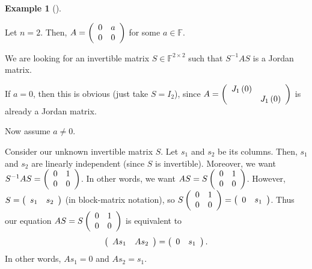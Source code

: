 \documentclass[numbers=enddot,12pt,final,onecolumn,notitlepage]{scrartcl}%
\numberwithin{exer}{subsection}
\theoremstyle{definition}
\newtheorem{exam}[theo]{Example}
\newenvironment{example}[1][]
{\begin{exam}[#1]\begin{leftbar}}
{\end{leftbar}\end{exam}}
\begin{document}
\begin{example}
Let $n=2$. Then, $A=\left(
\begin{array}
[c]{cc}%
0 & a\\
0 & 0
\end{array}
\right)  $ for some $a\in\mathbb{F}$.

We are looking for an invertible matrix $S\in\mathbb{F}^{2\times2}$ such that
$S^{-1}AS$ is a Jordan matrix.

If $a=0$, then this is obvious (just take $S=I_{2}$), since $A=\left(
\begin{array}
[c]{cc}%
J_{1}\left(  0\right)  & \\
& J_{1}\left(  0\right)
\end{array}
\right)  $ is already a Jordan matrix.

Now assume $a\neq0$.

Consider our unknown invertible matrix $S$. Let $s_{1}$ and $s_{2}$ be its
columns. Then, $s_{1}$ and $s_{2}$ are linearly independent (since $S$ is
invertible). Moreover, we want $S^{-1}AS=\left(
\begin{array}
[c]{cc}%
0 & 1\\
0 & 0
\end{array}
\right)  $. In other words, we want $AS=S\left(
\begin{array}
[c]{cc}%
0 & 1\\
0 & 0
\end{array}
\right)  $. However, $S=\left(
\begin{array}
[c]{cc}%
s_{1} & s_{2}%
\end{array}
\right)  $ (in block-matrix notation), so $S\left(
\begin{array}
[c]{cc}%
0 & 1\\
0 & 0
\end{array}
\right)  =\left(
\begin{array}
[c]{cc}%
0 & s_{1}%
\end{array}
\right)  $. Thus our equation $AS=S\left(
\begin{array}
[c]{cc}%
0 & 1\\
0 & 0
\end{array}
\right)  $ is equivalent to%
\[
\left(
\begin{array}
[c]{cc}%
As_{1} & As_{2}%
\end{array}
\right)  =\left(
\begin{array}
[c]{cc}%
0 & s_{1}%
\end{array}
\right)  .
\]
In other words, $As_{1}=0$ and $As_{2}=s_{1}$.


\end{example}
\end{document}
